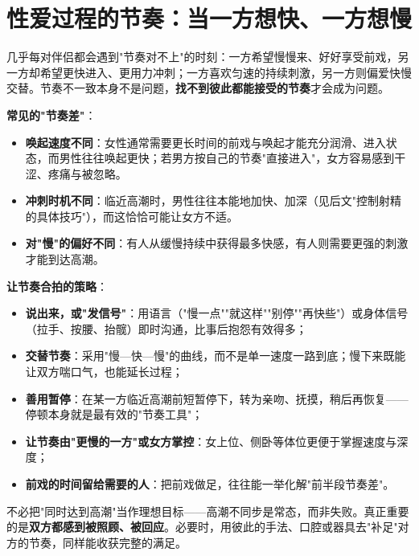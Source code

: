 \section{性爱过程的节奏：当一方想快、一方想慢}

几乎每对伴侣都会遇到"节奏对不上"的时刻：一方希望慢慢来、好好享受前戏，另一方却希望更快进入、更用力冲刺；一方喜欢匀速的持续刺激，另一方则偏爱快慢交替。节奏不一致本身不是问题，\textbf{找不到彼此都能接受的节奏}才会成为问题。

\noindent\textbf{常见的"节奏差"}：
\begin{itemize}
	\item \textbf{唤起速度不同}：女性通常需要更长时间的前戏与唤起才能充分润滑、进入状态，而男性往往唤起更快；若男方按自己的节奏"直接进入"，女方容易感到干涩、疼痛与被忽略。
	\item \textbf{冲刺时机不同}：临近高潮时，男性往往本能地加快、加深（见后文"控制射精的具体技巧"），而这恰恰可能让女方不适。
	\item \textbf{对"慢"的偏好不同}：有人从缓慢持续中获得最多快感，有人则需要更强的刺激才能到达高潮。
\end{itemize}

\noindent\textbf{让节奏合拍的策略}：
\begin{itemize}
	\item \textbf{说出来，或"发信号"}：用语言（"慢一点""就这样""别停""再快些"）或身体信号（拉手、按腰、抬髋）即时沟通，比事后抱怨有效得多；
	\item \textbf{交替节奏}：采用"慢—快—慢"的曲线，而不是单一速度一路到底；慢下来既能让双方喘口气，也能延长过程；
	\item \textbf{善用暂停}：在某一方临近高潮前短暂停下，转为亲吻、抚摸，稍后再恢复——停顿本身就是最有效的"节奏工具"；
	\item \textbf{让节奏由"更慢的一方"或女方掌控}：女上位、侧卧等体位更便于掌握速度与深度；
	\item \textbf{前戏的时间留给需要的人}：把前戏做足，往往能一举化解"前半段节奏差"。
\end{itemize}

\begin{tcolorbox}[colback=pink!5!white,colframe=red!50!black,title=贴心小叮咛]
不必把"同时达到高潮"当作理想目标——高潮不同步是常态，而非失败。真正重要的是\textbf{双方都感到被照顾、被回应}。必要时，用彼此的手法、口腔或器具去"补足"对方的节奏，同样能收获完整的满足。
\end{tcolorbox}
